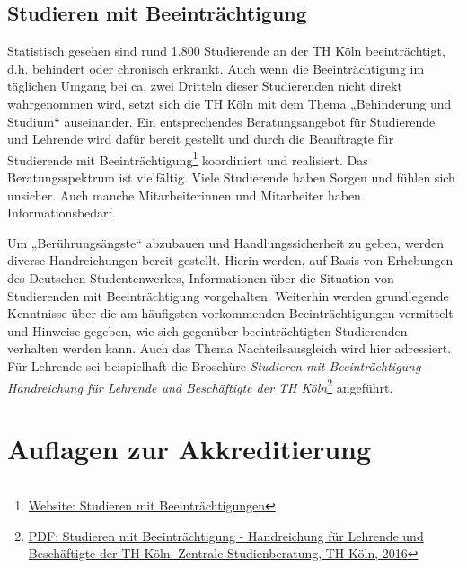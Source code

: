 \section{Studieren mit
Beeinträchtigung\label{/mi-2017/selbstbericht/1100-geschlechtergerechtigkeit-und-chancengleichheit/0000-geschlechtergerechtigkeit-und-chancengleichheit}}\label{studieren-mit-beeintruxe4chtigungpathlabelmi-2017selbstbericht1100-geschlechtergerechtigkeit-und-chancengleichheit0000-geschlechtergerechtigkeit-und-chancengleichheit}

Statistisch gesehen sind rund 1.800 Studierende an der TH Köln
beeinträchtigt, d.h. behindert oder chronisch erkrankt. Auch wenn die
Beeinträchtigung im täglichen Umgang bei ca. zwei Dritteln dieser
Studierenden nicht direkt wahrgenommen wird, setzt sich die TH Köln mit
dem Thema „Behinderung und Studium`` auseinander. Ein entsprechendes
Beratungsangebot für Studierende und Lehrende wird dafür bereit gestellt
und durch die Beauftragte für Studierende mit Beeinträchtigung\footnote{\href{https://www.th-koeln.de/studium/studieren-mit-beeintraechtigung_169.php}{Website:
  Studieren mit Beeinträchtigungen}} koordiniert und realisiert. Das
Beratungsspektrum ist vielfältig. Viele Studierende haben Sorgen und
fühlen sich unsicher. Auch manche Mitarbeiterinnen und Mitarbeiter haben
Informationsbedarf.

Um „Berührungsängste`` abzubauen und Handlungssicherheit zu geben,
werden diverse Handreichungen bereit gestellt. Hierin werden, auf Basis
von Erhebungen des Deutschen Studentenwerkes, Informationen über die
Situation von Studierenden mit Beeinträchtigung vorgehalten. Weiterhin
werden grundlegende Kenntnisse über die am häufigsten vorkommenden
Beeinträchtigungen vermittelt und Hinweise gegeben, wie sich gegenüber
beeinträchtigten Studierenden verhalten werden kann. Auch das Thema
Nachteilsausgleich wird hier adressiert. Für Lehrende sei beispielhaft
die Broschüre \emph{Studieren mit Beeinträchtigung - Handreichung für
Lehrende und Beschäftigte der TH Köln}\footnote{\href{https://www.th-koeln.de/mam/downloads/deutsch/studium/beratung/beeintraechtigung/a5brosch__re_beeintr__chtigung_2016.pdf}{PDF:
  Studieren mit Beeinträchtigung - Handreichung für Lehrende und
  Beschäftigte der TH Köln. Zentrale Studienberatung, TH Köln, 2016}}
angeführt.

\chapter{Auflagen zur
Akkreditierung\label{/mi-2017/selbstbericht/auflagen/0000-auflagen}}\label{auflagen-zur-akkreditierungpathlabelmi-2017selbstberichtauflagen0000-auflagen}

